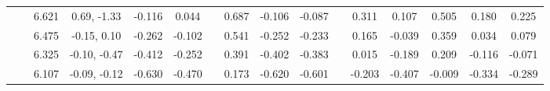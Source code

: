 \documentclass[prd,twocolumn,floatfix,nofootinbib]{revtex4}
\begin{document}
\begin{table*}[!htbp]
\begin{tabular}{cc|cc|cccccccccccc}
            &               &6.621  &0.69, -1.33 &-0.116 &0.044 & &0.687 &-0.106 &-0.087 & &0.311 &0.107 &0.505 &0.180 &0.225 \\
            &               &6.475  &-0.15, 0.10 &-0.262 &-0.102 & &0.541 &-0.252 &-0.233 & &0.165 &-0.039 &0.359 &0.034 &0.079 \\
            &               &6.325  &-0.10, -0.47 &-0.412 &-0.252 & &0.391 &-0.402 &-0.383 & &0.015 &-0.189 &0.209 &-0.116 &-0.071 \\
            &               &6.107  &-0.09, -0.12 &-0.630 &-0.470 & &0.173 &-0.620 &-0.601 & &-0.203 &-0.407 &-0.009 &-0.334 &-0.289 \\
        \bottomrule[0.5pt]\bottomrule[1.5pt]
    \end{tabular}
\end{table*}
\end{document}
